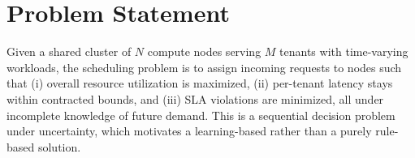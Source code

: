 \section{Problem Statement}
Given a shared cluster of $N$ compute nodes serving $M$ tenants with
time-varying workloads, the scheduling problem is to assign incoming
requests to nodes such that (i) overall resource utilization is maximized,
(ii) per-tenant latency stays within contracted bounds, and (iii) SLA
violations are minimized, all under incomplete knowledge of future demand.
This is a sequential decision problem under uncertainty, which motivates a
learning-based rather than a purely rule-based solution.

